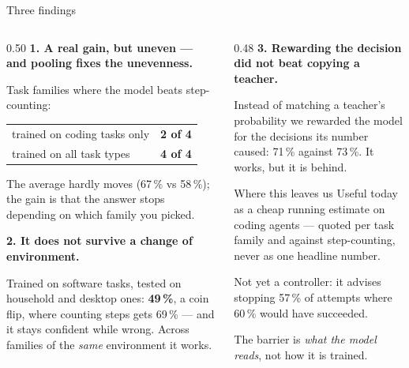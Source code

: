 \documentclass[11pt, aspectratio=169]{beamer}
\newcommand{\g}[1]{\textcolor{accent2}{\textbf{#1}}}
\newcommand{\bad}[1]{\textcolor{warn}{\textbf{#1}}}
\begin{document}
\begin{frame}{Three findings}
\footnotesize
\begin{columns}[t]
\begin{column}{0.50\textwidth}
\textbf{1. A real gain, but uneven --- and pooling fixes the unevenness.}

\smallskip
Task families where the model beats step-counting:
\begin{center}\footnotesize
\begin{tabular}{lc}
\toprule
trained on coding tasks only & \bad{2 of 4} \\
trained on all task types    & \g{4 of 4}   \\
\bottomrule
\end{tabular}
\end{center}
\smallskip
The average hardly moves (67\,\% vs 58\,\%); the gain is that the answer stops
depending on which family you picked.

\medskip
\textbf{2. It does not survive a change of environment.}

\smallskip
Trained on software tasks, tested on household and desktop ones: \bad{49\,\%},
a coin flip, where counting steps gets 69\,\% --- and it stays confident while
wrong. Across families of the \emph{same} environment it works.
\end{column}
\begin{column}{0.48\textwidth}
\textbf{3. Rewarding the decision did not beat copying a teacher.}

\smallskip
Instead of matching a teacher's probability we rewarded the model for the
decisions its number caused: 71\,\% against 73\,\%. It works, but it is behind.

\medskip
\begin{block}{Where this leaves us}
Useful today as a cheap running estimate on coding agents --- quoted per task
family and against step-counting, never as one headline number.

\smallskip
Not yet a controller: it advises stopping 57\,\% of attempts where 60\,\%
would have succeeded.

\smallskip
The barrier is \emph{what the model reads}, not how it is trained.
\end{block}
\end{column}
\end{columns}
\end{frame}
\end{document}
